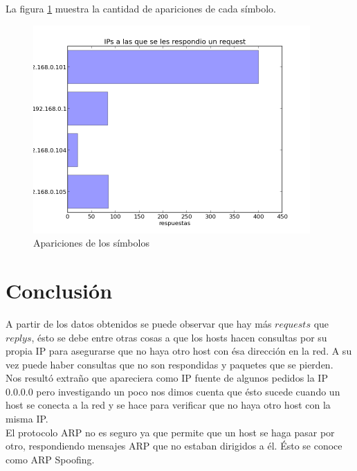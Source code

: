 \documentclass{article}
\begin{document}
La figura \ref{fig:red1replied:count} muestra la cantidad de apariciones de
cada símbolo.

\begin{figure}[h!]
    \centering
    \includegraphics[width=300pt]{red1replied.png}
    \caption{Apariciones de los símbolos}
    \label{fig:red1replied:count}
\end{figure}
\newpage

\section{Conclusión}
A partir de los datos obtenidos se puede observar que hay más $requests$ que
$replys$, ésto se debe entre otras cosas a que los hosts hacen consultas por
su propia IP para asegurarse que no haya otro host con ésa dirección en la
red. A su vez puede haber consultas que no son respondidas y paquetes que se
pierden.\\ Nos resultó extraño que apareciera como IP fuente de algunos
pedidos la IP 0.0.0.0 pero investigando un poco nos dimos cuenta que ésto
sucede cuando un host se conecta a la red y se hace para verificar que no haya
otro host con la misma IP.\\ El protocolo ARP no es seguro ya que permite que
un host se haga pasar por otro, respondiendo mensajes ARP que no estaban
dirigidos a él. Ésto se conoce como ARP Spoofing.
\end{document}
